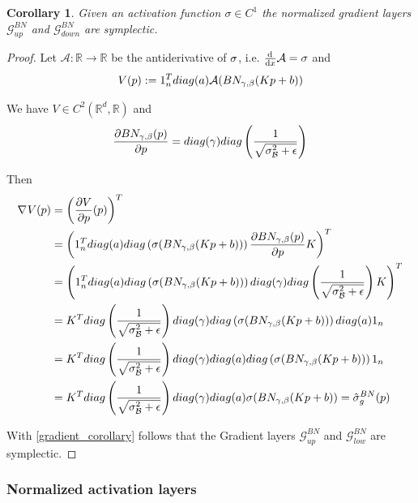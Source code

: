 \documentclass[twoside,a4paper]{article}
\newtheorem{corollary}{Corollary}
\begin{document}

\begin{corollary}
	Given an activation function $\sigma \in C^1$
	the normalized gradient layers $\mathcal{G}^{BN}_{up}$ and $\mathcal{G}^{BN}_{down}$
	are symplectic.
\end{corollary}
\begin{proof}
	Let $\mathcal{A}: \mathbb{R} \to \mathbb{R}$ be the antiderivative of $\sigma$, 
	i.e. $\frac{\mathrm{d}^{}}{\mathrm{d}x} \mathcal{A} = \sigma$ and
	\begin{equation*}
		V(p) := 1_{n}^Tdiag(a)\mathcal{A}(BN_{\gamma, \beta}(Kp+b))
	\end{equation*}

	We have $V \in C^2(\mathbb{R}^d, \mathbb{R})$ and
	\begin{equation*}
		\frac{\partial BN_{\gamma, \beta}(p)}{\partial p} = 
		diag(\gamma)diag\left( \frac{1}{\sqrt{\sigma^2_\mathcal{B} + \epsilon}} \right)
	\end{equation*}

	Then
	\begin{align*}
		\nabla_{}{V(p)} &= \left(\frac{\partial V}{\partial p}(p)\right)^T \\
		&= \left( 1_n^T diag(a) diag \left( \sigma(BN_{\gamma, \beta}(Kp+b))\right)
		\frac{\partial BN_{\gamma, \beta}(p)}{\partial p} K \right)^T \\
		&= \left( 1_n^T diag(a) diag \left( \sigma(BN_{\gamma, \beta}(Kp+b))\right)
		diag(\gamma) diag\left( \frac{1}{\sqrt{\sigma^2_\mathcal{B} + \epsilon}} \right) K \right)^T \\
		&= K^T diag\left( \frac{1}{\sqrt{\sigma^2_\mathcal{B} + \epsilon}} \right) diag(\gamma)
		diag\left(\sigma(BN_{\gamma, \beta}(Kp+b))\right) diag(a) 1_n \\
		&= K^T diag\left( \frac{1}{\sqrt{\sigma^2_\mathcal{B} + \epsilon}} \right) diag(\gamma)
		diag(a) diag\left(\sigma(BN_{\gamma, \beta}(Kp+b))\right) 1_n \\
		&= K^T diag\left( \frac{1}{\sqrt{\sigma^2_\mathcal{B} + \epsilon}} \right) diag(\gamma)
		diag(a) \sigma(BN_{\gamma, \beta}(Kp+b)) = \hat{\sigma}^{BN}_g(p)
	\end{align*}

	With \cref{gradient_corollary} follows that the Gradient layers
	$\mathcal{G}^{BN}_{up}$ and $\mathcal{G}^{BN}_{low}$ are symplectic.
\end{proof}

\subsubsection{Normalized activation layers}
\end{document}
